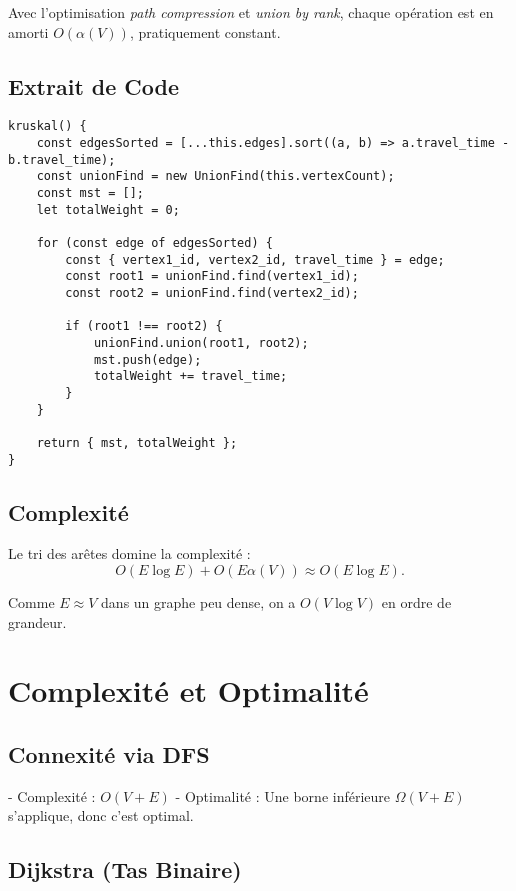 \documentclass[a4paper,12pt]{article}
\begin{document}
Avec l’optimisation \emph{path compression} et \emph{union by rank}, chaque opération est en amorti $O(\alpha(V))$, pratiquement constant.

\subsection{Extrait de Code}

\begin{verbatim}
kruskal() {
    const edgesSorted = [...this.edges].sort((a, b) => a.travel_time - b.travel_time);
    const unionFind = new UnionFind(this.vertexCount);
    const mst = [];
    let totalWeight = 0;

    for (const edge of edgesSorted) {
        const { vertex1_id, vertex2_id, travel_time } = edge;
        const root1 = unionFind.find(vertex1_id);
        const root2 = unionFind.find(vertex2_id);

        if (root1 !== root2) {
            unionFind.union(root1, root2);
            mst.push(edge);
            totalWeight += travel_time;
        }
    }

    return { mst, totalWeight };
}
\end{verbatim}

\subsection{Complexité}

Le tri des arêtes domine la complexité :
\[
O(E \log E) + O(E \alpha(V)) \approx O(E \log E).
\]

Comme $E \approx V$ dans un graphe peu dense, on a $O(V \log V)$ en ordre de grandeur.

\section{Complexité et Optimalité}

\subsection{Connexité via DFS}

- Complexité : $O(V+E)$
- Optimalité : Une borne inférieure $\Omega(V+E)$ s’applique, donc c’est optimal.

\subsection{Dijkstra (Tas Binaire)}
\end{document}
